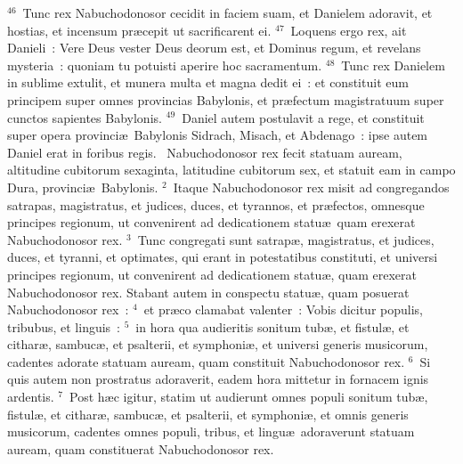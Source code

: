 ${}^{46}$~Tunc rex Nabuchodonosor cecidit in faciem suam, et Danielem adoravit, et hostias, et incensum pr\ae cepit ut sacrificarent ei.
${}^{47}$~Loquens ergo rex, ait Danieli~: Vere Deus vester Deus deorum est, et Dominus regum, et revelans mysteria~: quoniam tu potuisti aperire hoc sacramentum.
${}^{48}$~Tunc rex Danielem in sublime extulit, et munera multa et magna dedit ei~: et constituit eum principem super omnes provincias Babylonis, et pr\ae fectum magistratuum super cunctos sapientes Babylonis.
${}^{49}$~Daniel autem postulavit a rege, et constituit super opera provinci\ae\ Babylonis Sidrach, Misach, et Abdenago~: ipse autem Daniel erat in foribus regis.
~Nabuchodonosor rex fecit statuam auream, altitudine cubitorum sexaginta, latitudine cubitorum sex, et statuit eam in campo Dura, provinci\ae\ Babylonis.
${}^{2}$~Itaque Nabuchodonosor rex misit ad congregandos satrapas, magistratus, et judices, duces, et tyrannos, et pr\ae fectos, omnesque principes regionum, ut convenirent ad dedicationem statu\ae\ quam erexerat Nabuchodonosor rex.
${}^{3}$~Tunc congregati sunt satrap\ae , magistratus, et judices, duces, et tyranni, et optimates, qui erant in potestatibus constituti, et universi principes regionum, ut convenirent ad dedicationem statu\ae , quam erexerat Nabuchodonosor rex. Stabant autem in conspectu statu\ae , quam posuerat Nabuchodonosor rex~:
${}^{4}$~et pr\ae co clamabat valenter~: Vobis dicitur populis, tribubus, et linguis~:
${}^{5}$~in hora qua audieritis sonitum tub\ae , et fistul\ae , et cithar\ae , sambuc\ae , et psalterii, et symphoni\ae , et universi generis musicorum, cadentes adorate statuam auream, quam constituit Nabuchodonosor rex.
${}^{6}$~Si quis autem non prostratus adoraverit, eadem hora mittetur in fornacem ignis ardentis.
${}^{7}$~Post h\ae c igitur, statim ut audierunt omnes populi sonitum tub\ae , fistul\ae , et cithar\ae , sambuc\ae , et psalterii, et symphoni\ae , et omnis generis musicorum, cadentes omnes populi, tribus, et lingu\ae\ adoraverunt statuam auream, quam constituerat Nabuchodonosor rex.



